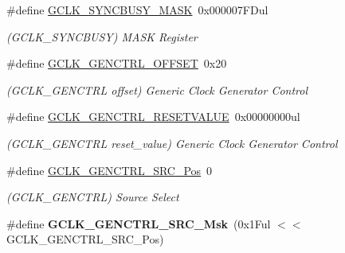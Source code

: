 \begin{DoxyCompactItemize}
\item 
\hypertarget{group___s_a_m_l21___g_c_l_k_ga67a06d90861a5d2ec78146d390160dcd}{}\#define \hyperlink{group___s_a_m_l21___g_c_l_k_ga67a06d90861a5d2ec78146d390160dcd}{G\+C\+L\+K\+\_\+\+S\+Y\+N\+C\+B\+U\+S\+Y\+\_\+\+M\+A\+S\+K}~0x000007\+F\+Dul\label{group___s_a_m_l21___g_c_l_k_ga67a06d90861a5d2ec78146d390160dcd}

\begin{DoxyCompactList}\small\item\em (G\+C\+L\+K\+\_\+\+S\+Y\+N\+C\+B\+U\+S\+Y) M\+A\+S\+K Register \end{DoxyCompactList}\item 
\hypertarget{group___s_a_m_l21___g_c_l_k_ga93d991084be98b48eb3bd242d2114042}{}\#define \hyperlink{group___s_a_m_l21___g_c_l_k_ga93d991084be98b48eb3bd242d2114042}{G\+C\+L\+K\+\_\+\+G\+E\+N\+C\+T\+R\+L\+\_\+\+O\+F\+F\+S\+E\+T}~0x20\label{group___s_a_m_l21___g_c_l_k_ga93d991084be98b48eb3bd242d2114042}

\begin{DoxyCompactList}\small\item\em (G\+C\+L\+K\+\_\+\+G\+E\+N\+C\+T\+R\+L offset) Generic Clock Generator Control \end{DoxyCompactList}\item 
\hypertarget{group___s_a_m_l21___g_c_l_k_ga6fe333c528ab24313886414224566cfc}{}\#define \hyperlink{group___s_a_m_l21___g_c_l_k_ga6fe333c528ab24313886414224566cfc}{G\+C\+L\+K\+\_\+\+G\+E\+N\+C\+T\+R\+L\+\_\+\+R\+E\+S\+E\+T\+V\+A\+L\+U\+E}~0x00000000ul\label{group___s_a_m_l21___g_c_l_k_ga6fe333c528ab24313886414224566cfc}

\begin{DoxyCompactList}\small\item\em (G\+C\+L\+K\+\_\+\+G\+E\+N\+C\+T\+R\+L reset\+\_\+value) Generic Clock Generator Control \end{DoxyCompactList}\item 
\hypertarget{group___s_a_m_l21___g_c_l_k_ga3ca6fb0d36a0f1194282d2517b22965f}{}\#define \hyperlink{group___s_a_m_l21___g_c_l_k_ga3ca6fb0d36a0f1194282d2517b22965f}{G\+C\+L\+K\+\_\+\+G\+E\+N\+C\+T\+R\+L\+\_\+\+S\+R\+C\+\_\+\+Pos}~0\label{group___s_a_m_l21___g_c_l_k_ga3ca6fb0d36a0f1194282d2517b22965f}

\begin{DoxyCompactList}\small\item\em (G\+C\+L\+K\+\_\+\+G\+E\+N\+C\+T\+R\+L) Source Select \end{DoxyCompactList}\item 
\hypertarget{group___s_a_m_l21___g_c_l_k_ga1341d6ea0cb6d9dc6bb42710ac632eed}{}\#define {\bfseries G\+C\+L\+K\+\_\+\+G\+E\+N\+C\+T\+R\+L\+\_\+\+S\+R\+C\+\_\+\+Msk}~(0x1\+Ful $<$$<$ G\+C\+L\+K\+\_\+\+G\+E\+N\+C\+T\+R\+L\+\_\+\+S\+R\+C\+\_\+\+Pos)\label{group___s_a_m_l21___g_c_l_k_ga1341d6ea0cb6d9dc6bb42710ac632eed}


\end{DoxyCompactItemize}
